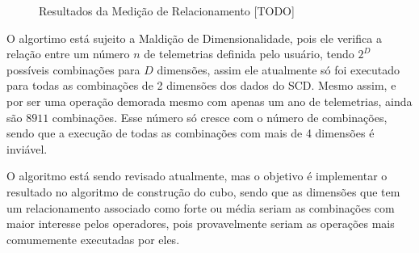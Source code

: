 \begin{figure}[ht]
	\caption{\color{red} Resultados da Medição de Relacionamento [TODO]}
	\vspace{6mm}
	\begin{center}
	\end{center}
	\vspace{4mm}
	\legenda{}
	\label{fig:similarityresults}
\end{figure}

O algortimo está sujeito a Maldição de Dimensionalidade, pois ele verifica a relação entre um número $n$ de telemetrias definida pelo usuário, tendo $2^D$ possíveis combinações para $D$ dimensões, assim ele atualmente só foi executado para todas as combinações de 2 dimensões dos dados do SCD.
Mesmo assim, e por ser uma operação demorada mesmo com apenas um ano de telemetrias, ainda são $8911$ combinações.
Esse número só cresce com o número de combinações, sendo que a execução de todas as combinações com mais de 4 dimensões é inviável.

O algoritmo está sendo revisado atualmente, mas o objetivo é implementar o resultado no algoritmo de construção do cubo, sendo que as dimensões que tem um relacionamento associado como forte ou média seriam as combinações com maior interesse pelos operadores, pois provavelmente seriam as operações mais comumemente executadas por eles.

